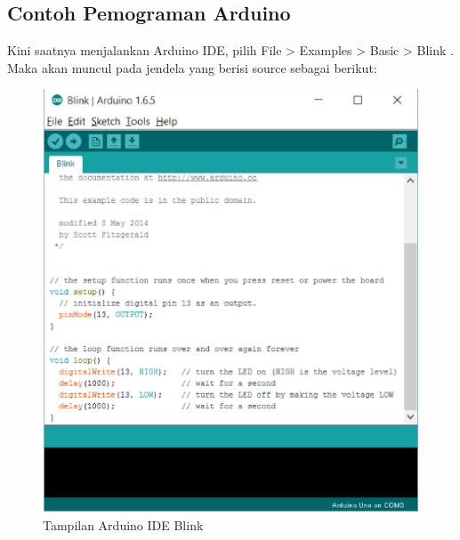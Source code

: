 \subsection{Contoh Pemograman Arduino}
Kini saatnya menjalankan Arduino IDE, pilih File > Examples > Basic > Blink  . Maka akan muncul pada jendela yang berisi source sebagai berikut:
\begin{figure}[H]
\centering
\includegraphics[width=1\textwidth]{figures/ide4.png}
\caption{Tampilan Arduino IDE Blink}
\label{print}
\end{figure}

